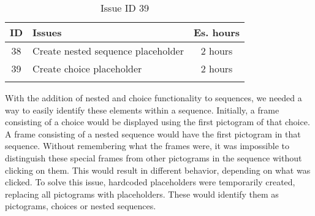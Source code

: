 \begin{longtable} { | c | p{12cm} | c | } 
\hline
	ID 	&	Issues	&		 Es. hours \\\hline
	38	&	Create nested sequence placeholder	&	2 hours \\\hline
	39 	&	Create choice placeholder	&	2 hours \\\hline
\caption{Issue ID 39}
\label{tab:spr3_choiceplaceholder}
\end{longtable}

With the addition of nested and choice functionality to sequences, we needed a way to easily identify these elements within a sequence. Initially, a frame consisting of a choice would be displayed using the first pictogram of that choice. A frame consisting of a nested sequence would have the first pictogram in that sequence. Without remembering what the frames were, it was impossible to distinguish these special frames from other pictograms in the sequence without clicking on them. This would result in different behavior, depending on what was clicked. To solve this issue, hardcoded placeholders were temporarily created, replacing all pictograms with placeholders. These would identify them as pictograms, choices or nested sequences.	
